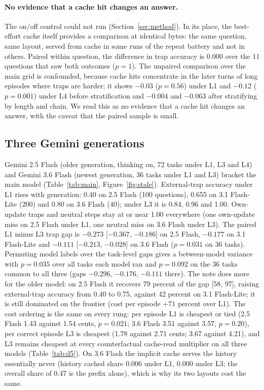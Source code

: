 \paragraph{No evidence that a cache hit changes an answer.} The on/off control could not run (Section~\ref{sec:method}). In its place, the best-effort cache itself provides a comparison at identical bytes: the same question, same layout, served from cache in some runs of the repeat battery and not in others. Paired within question, the difference in trap accuracy is 0.000 over the 11 questions that saw both outcomes ($p = 1$). The unpaired comparison over the main grid is confounded, because cache hits concentrate in the later turns of long episodes where traps are harder; it shows $-0.03$ ($p = 0.56$) under L1 and $-0.12$ ($p = 0.001$) under L4 before stratification and $-0.004$ and $-0.063$ after stratifying by length and chain. We read this as no evidence that a cache hit changes an answer, with the caveat that the paired sample is small.

\subsection{Three Gemini generations}
\label{sec:ladder}
Gemini 2.5 Flash (older generation, thinking on, 72 tasks under L1, L3 and L4) and Gemini 3.6 Flash (newest generation, 36 tasks under L1 and L3) bracket the main model (Table~\ref{tab:main}, Figure~\ref{fig:stale}). External-trap accuracy under L1 rises with generation: 0.40 on 2.5 Flash (100 questions), 0.655 on 3.1 Flash-Lite (200) and 0.80 on 3.6 Flash (40); under L3 it is 0.84, 0.96 and 1.00. Own-update traps and neutral steps stay at or near 1.00 everywhere (one own-update miss on 2.5 Flash under L1, one neutral miss on 3.6 Flash under L3). The paired L1 minus L3 trap gap is $-0.273$ [$-0.367$, $-0.186$] on 2.5 Flash, $-0.177$ on 3.1 Flash-Lite and $-0.111$ [$-0.213$, $-0.028$] on 3.6 Flash ($p = 0.031$ on 36 tasks). Permuting model labels over the task-level gaps gives a between-model variance with $p = 0.035$ over all tasks each model ran and $p = 0.092$ on the 36 tasks common to all three (gaps $-0.296$, $-0.176$, $-0.111$ there). The note does more for the older model: on 2.5 Flash it recovers 79 percent of the gap [58, 97], raising external-trap accuracy from 0.40 to 0.75, against 42 percent on 3.1 Flash-Lite; it is still dominated on the frontier (cost per episode $+71$ percent over L1). The cost ordering is the same on every rung: per episode L1 is cheapest or tied (2.5 Flash 1.43 against 1.54 cents, $p = 0.021$; 3.6 Flash 3.51 against 3.57, $p = 0.20$), per correct episode L3 is cheapest (1.78 against 2.71 cents; 3.67 against 4.21), and L3 remains cheapest at every counterfactual cache-read multiplier on all three models (Table~\ref{tab:d5}). On 3.6 Flash the implicit cache serves the history essentially never (history cached share 0.006 under L1, 0.000 under L3; the overall share of 0.47 is the prefix alone), which is why its two layouts cost the same.

